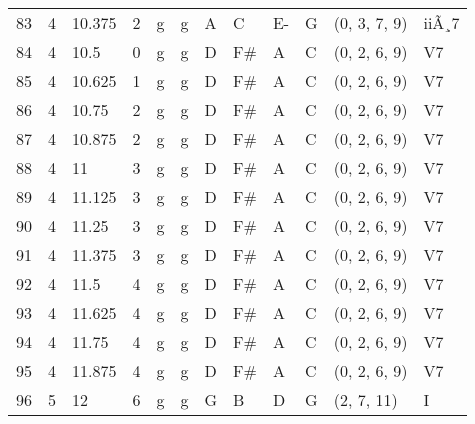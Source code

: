 \begin{tabular}{llllllllllll}
83  & 4       & 10.375 & 2               & g          & g              & A      & C       & E-     & G         & (0, 3, 7, 9)     & iiÃ¸7          \\
84  & 4       & 10.5   & 0               & g          & g              & D      & F#      & A      & C         & (0, 2, 6, 9)     & V7             \\
85  & 4       & 10.625 & 1               & g          & g              & D      & F#      & A      & C         & (0, 2, 6, 9)     & V7             \\
86  & 4       & 10.75  & 2               & g          & g              & D      & F#      & A      & C         & (0, 2, 6, 9)     & V7             \\
87  & 4       & 10.875 & 2               & g          & g              & D      & F#      & A      & C         & (0, 2, 6, 9)     & V7             \\
88  & 4       & 11     & 3               & g          & g              & D      & F#      & A      & C         & (0, 2, 6, 9)     & V7             \\
89  & 4       & 11.125 & 3               & g          & g              & D      & F#      & A      & C         & (0, 2, 6, 9)     & V7             \\
90  & 4       & 11.25  & 3               & g          & g              & D      & F#      & A      & C         & (0, 2, 6, 9)     & V7             \\
91  & 4       & 11.375 & 3               & g          & g              & D      & F#      & A      & C         & (0, 2, 6, 9)     & V7             \\
92  & 4       & 11.5   & 4               & g          & g              & D      & F#      & A      & C         & (0, 2, 6, 9)     & V7             \\
93  & 4       & 11.625 & 4               & g          & g              & D      & F#      & A      & C         & (0, 2, 6, 9)     & V7             \\
94  & 4       & 11.75  & 4               & g          & g              & D      & F#      & A      & C         & (0, 2, 6, 9)     & V7             \\
95  & 4       & 11.875 & 4               & g          & g              & D      & F#      & A      & C         & (0, 2, 6, 9)     & V7             \\
96  & 5       & 12     & 6               & g          & g              & G      & B       & D      & G         & (2, 7, 11)       & I              \\

\end{tabular}
